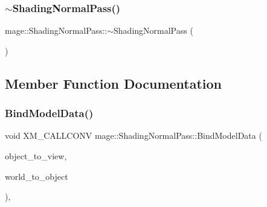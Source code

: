 \hypertarget{classmage_1_1_shading_normal_pass_aba7194077210d32dbcbc6cfbf4adba8f}{}\label{classmage_1_1_shading_normal_pass_aba7194077210d32dbcbc6cfbf4adba8f} 
\subsubsection{\texorpdfstring{$\sim$\+Shading\+Normal\+Pass()}{~ShadingNormalPass()}}
{\footnotesize\ttfamily mage\+::\+Shading\+Normal\+Pass\+::$\sim$\+Shading\+Normal\+Pass (\begin{DoxyParamCaption}{ }\end{DoxyParamCaption})\hspace{0.3cm}{\ttfamily [default]}}



\subsection{Member Function Documentation}
\hypertarget{classmage_1_1_shading_normal_pass_abbcc01b6d2e747ffd35bc5a69483db65}{}\label{classmage_1_1_shading_normal_pass_abbcc01b6d2e747ffd35bc5a69483db65} 
\subsubsection{\texorpdfstring{Bind\+Model\+Data()}{BindModelData()}}
{\footnotesize\ttfamily void X\+M\+\_\+\+C\+A\+L\+L\+C\+O\+NV mage\+::\+Shading\+Normal\+Pass\+::\+Bind\+Model\+Data (\begin{DoxyParamCaption}\item[{F\+X\+M\+M\+A\+T\+R\+IX}]{object\+\_\+to\+\_\+view,  }\item[{F\+X\+M\+M\+A\+T\+R\+IX}]{world\+\_\+to\+\_\+object }\end{DoxyParamCaption})\hspace{0.3cm}{\ttfamily [private]}, {\ttfamily [noexcept]}}

\hypertarget{classmage_1_1_shading_normal_pass_ab691c2125f9e21c7e70f2737037504bc}{}\label{classmage_1_1_shading_normal_pass_ab691c2125f9e21c7e70f2737037504bc} 
